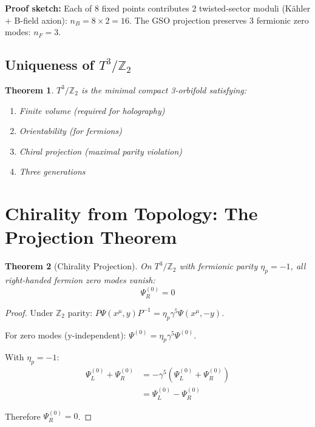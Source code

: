 \documentclass[12pt,a4paper]{article}
\newtheorem{theorem}{Theorem}[section]
\newcommand{\Ztwo}{\mathbb{Z}_2}
\newcommand{\Tthree}{T^3}
\newcommand{\nB}{n_B}
\newcommand{\nF}{n_F}
\begin{document}
\textbf{Proof sketch:} Each of 8 fixed points contributes 2 twisted-sector moduli (K\"ahler + B-field axion): $\nB = 8 \times 2 = 16$. The GSO projection preserves 3 fermionic zero modes: $\nF = 3$.

\subsection{Uniqueness of $\Tthree/\Ztwo$}

\begin{theorem}
$\Tthree/\Ztwo$ is the minimal compact 3-orbifold satisfying:
\begin{enumerate}
    \item Finite volume (required for holography)
    \item Orientability (for fermions)
    \item Chiral projection (maximal parity violation)
    \item Three generations
\end{enumerate}
\end{theorem}

\section{Chirality from Topology: The Projection Theorem}
\label{sec:chirality}

\begin{theorem}[Chirality Projection]
On $\Tthree/\Ztwo$ with fermionic parity $\eta_p = -1$, all right-handed fermion zero modes vanish:
\begin{equation}
\boxed{\Psi_R^{(0)} = 0}
\end{equation}
\end{theorem}

\begin{proof}
Under $\Ztwo$ parity: $P\Psi(x^\mu, y)P^{-1} = \eta_p \gamma^5 \Psi(x^\mu, -y)$.

For zero modes (y-independent): $\Psi^{(0)} = \eta_p \gamma^5 \Psi^{(0)}$.

With $\eta_p = -1$:
\begin{align}
\Psi_L^{(0)} + \Psi_R^{(0)} &= -\gamma^5(\Psi_L^{(0)} + \Psi_R^{(0)}) \\
&= \Psi_L^{(0)} - \Psi_R^{(0)}
\end{align}

Therefore $\Psi_R^{(0)} = 0$.
\end{proof}
\end{document}
